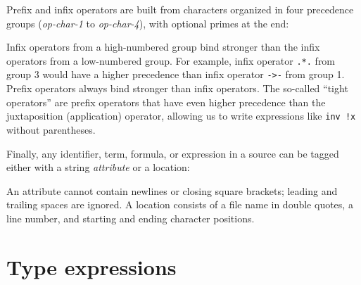 Prefix and infix operators are built from characters organized in four
precedence groups (\textsl{op-char-1} to \textsl{op-char-4}), with
optional primes at the end:
\begin{center}\end{center}
Infix operators from a high-numbered group bind stronger
than the infix operators from a low-numbered group.
For example, infix operator \texttt{.*.} from group 3
would have a higher precedence than infix operator
\texttt{->-} from group 1.
Prefix operators always bind stronger than infix operators.
The so-called ``tight operators'' are prefix operators that have even
higher precedence than the juxtaposition (application) operator,
allowing us to write expressions like \texttt{inv !x}
without parentheses.


Finally, any identifier, term, formula, or expression
in a \whyml source can be tagged either with a string
\textit{attribute} or a location:
\begin{center}\end{center}
An attribute cannot contain newlines or closing square brackets;
leading and trailing spaces are ignored.
A location consists of a file name in double quotes,
a line number, and starting and ending character positions.

\section{Type expressions}
\label{sec:types}

